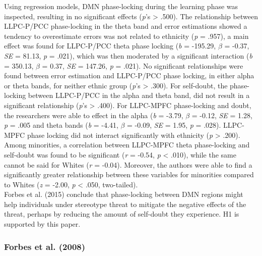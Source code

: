 \documentclass[
  stu,floatsintext]{apa7}
\begin{document}
Using regression models, DMN phase-locking during the learning phase was inspected, resulting in no significant effects (\emph{p}'s \textgreater{} .500).
The relationship between LLPC-P/PCC phase-locking in the theta band and error estimations showed a tendency to overestimate errors was not related to ethnicity (\emph{p} = .957), a main effect was found for LLPC-P/PCC theta phase locking (\emph{b} = -195.29, \(\beta\) = -0.37, \emph{SE} = 81.13, \emph{p} = .021), which was then moderated by a significant interaction (\emph{b} = 350.13, \(\beta\) = 0.37, \emph{SE} = 147.26, \emph{p} = .021).
No significant relationships were found between error estimation and LLPC-P/PCC phase locking, in either alpha or theta bands, for neither ethnic group (\emph{p}'s \textgreater{} .300).
For self-doubt, the phase-locking between LLPC-P/PCC in the alpha and theta band, did not result in a significant relationship (\emph{p}'s \textgreater{} .400).
For LLPC-MPFC phase-locking and doubt, the researchers were able to effect in the alpha (\emph{b} = -3.79, \(\beta\) = -0.12, \emph{SE} = 1.28, \emph{p} = .005 and theta bands (\emph{b} = -4.41, \(\beta\) = -0.09, \emph{SE} = 1.95, \emph{p} = .028).
LLPC-MPFC phase locking did not interact significantly with ethnicity (\emph{p} \textgreater{} .200).
Among minorities, a correlation between LLPC-MPFC theta phase-locking and self-doubt was found to be significant (\emph{r} = -0.54, \emph{p} \textless{} .010), while the same cannot be said for Whites (\emph{r} = -0.04).
Moreover, the authors were able to find a significantly greater relationship between these variables for minorities compared to Whites (\emph{z} = -2.00, \emph{p} \textless{} .050, two-tailed).\\
Forbes et al. (2015) conclude that phase-locking between DMN regions might help individuals under stereotype threat to mitigate the negative effects of the threat, perhaps by reducing the amount of self-doubt they experience.
H1 is supported by this paper.

\subsubsection{Forbes et al. (2008)}\label{forbesroledevaluingdiscounting2008}
\end{document}
